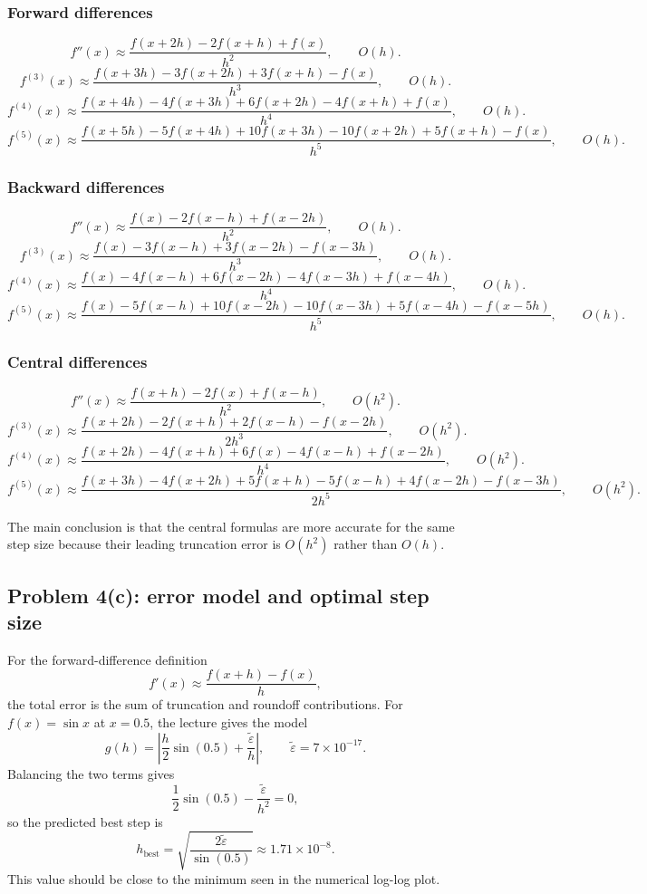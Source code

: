 \documentclass[12pt,a4paper]{article}
\begin{document}
\subsubsection{Forward differences}

\[
f''(x) \approx \frac{f(x+2h)-2f(x+h)+f(x)}{h^2},
\qquad O(h).
\]
\[
f^{(3)}(x) \approx \frac{f(x+3h)-3f(x+2h)+3f(x+h)-f(x)}{h^3},
\qquad O(h).
\]
\[
f^{(4)}(x) \approx \frac{f(x+4h)-4f(x+3h)+6f(x+2h)-4f(x+h)+f(x)}{h^4},
\qquad O(h).
\]
\[
f^{(5)}(x) \approx \frac{f(x+5h)-5f(x+4h)+10f(x+3h)-10f(x+2h)+5f(x+h)-f(x)}{h^5},
\qquad O(h).
\]

\subsubsection{Backward differences}

\[
f''(x) \approx \frac{f(x)-2f(x-h)+f(x-2h)}{h^2},
\qquad O(h).
\]
\[
f^{(3)}(x) \approx \frac{f(x)-3f(x-h)+3f(x-2h)-f(x-3h)}{h^3},
\qquad O(h).
\]
\[
f^{(4)}(x) \approx \frac{f(x)-4f(x-h)+6f(x-2h)-4f(x-3h)+f(x-4h)}{h^4},
\qquad O(h).
\]
\[
f^{(5)}(x) \approx \frac{f(x)-5f(x-h)+10f(x-2h)-10f(x-3h)+5f(x-4h)-f(x-5h)}{h^5},
\qquad O(h).
\]

\subsubsection{Central differences}

\[
f''(x) \approx \frac{f(x+h)-2f(x)+f(x-h)}{h^2},
\qquad O(h^2).
\]
\[
f^{(3)}(x) \approx \frac{f(x+2h)-2f(x+h)+2f(x-h)-f(x-2h)}{2h^3},
\qquad O(h^2).
\]
\[
f^{(4)}(x) \approx \frac{f(x+2h)-4f(x+h)+6f(x)-4f(x-h)+f(x-2h)}{h^4},
\qquad O(h^2).
\]
\[
f^{(5)}(x) \approx \frac{f(x+3h)-4f(x+2h)+5f(x+h)-5f(x-h)+4f(x-2h)-f(x-3h)}{2h^5},
\qquad O(h^2).
\]

The main conclusion is that the central formulas are more accurate for the same step size because their leading truncation error is $O(h^2)$ rather than $O(h)$.

\subsection{Problem 4(c): error model and optimal step size}

For the forward-difference definition
\[
f'(x) \approx \frac{f(x+h)-f(x)}{h},
\]
the total error is the sum of truncation and roundoff contributions. For $f(x)=\sin x$ at $x=0.5$, the lecture gives the model
\[
g(h)=\left|\frac{h}{2}\sin(0.5)+\frac{\tilde{\varepsilon}}{h}\right|,
\qquad \tilde{\varepsilon}=7\times 10^{-17}.
\]
Balancing the two terms gives
\[
\frac{1}{2}\sin(0.5)-\frac{\tilde{\varepsilon}}{h^2}=0,
\]
so the predicted best step is
\[
h_{\mathrm{best}}
=
\sqrt{\frac{2\tilde{\varepsilon}}{\sin(0.5)}}
\approx 1.71\times 10^{-8}.
\]
This value should be close to the minimum seen in the numerical log-log plot.
\end{document}
